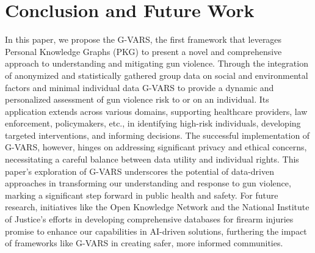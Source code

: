 \documentclass[11pt]{article}
\begin{document}
\section{Conclusion and Future Work}\label{sec:conclusion}
In this paper, we propose the \textsf{G-VARS}, the first framework that leverages Personal Knowledge Graphs (PKG) to present a novel and comprehensive approach to understanding and mitigating gun violence. Through the integration of anonymized and statistically gathered group data on social and environmental factors and minimal individual data \textsf{G-VARS} to provide a dynamic and personalized assessment of gun violence risk to or on an individual. Its application extends across various domains, supporting healthcare providers, law enforcement, policymakers, etc., in identifying high-risk individuals, developing targeted interventions, and informing decisions. The successful implementation of G-VARS, however, hinges on addressing significant privacy and ethical concerns, necessitating a careful balance between data utility and individual rights. This paper's exploration of \textsf{G-VARS} underscores the potential of data-driven approaches in transforming our understanding and response to gun violence, marking a significant step forward in public health and safety. For future research, initiatives like the Open Knowledge Network and the National Institute of Justice's efforts in developing comprehensive databases for firearm injuries promise to enhance our capabilities in AI-driven solutions, furthering the impact of frameworks like \textsf{G-VARS} in creating safer, more informed communities.



\end{document}
